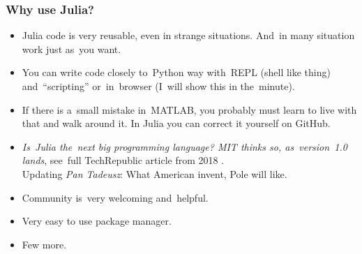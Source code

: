 \documentclass[10pt,t]{beamer}
\begin{document}
\begin{frame}
  \frametitle{Why use Julia?}


  \begin{itemize}
    \RaggedRight

  \item Julia code is very reusable, even in strange situations.
    And~in many situation work just as~you want.

  \item You can write code closely to~Python way with~REPL (shell like
    thing) and~``scripting'' or~in~browser (I~will \alert{show} this
    in the~minute).

  \item If there is a~small mistake in~MATLAB, you probably must learn
    to live with that and walk around it. In Julia you can correct it
    yourself on GitHub.

  \item \textit{Is~Julia the~next big programming language? MIT thinks
      so, as~version~1.0 lands}, see~full TechRepublic article from 2018
    . \\
    Updating \textit{Pan Tadeusz}: What American invent, Pole will like.


  \item Community is~very welcoming and~helpful.

  \item Very easy to use package manager.

  \item Few more.

  \end{itemize}

\end{frame}
\end{document}
